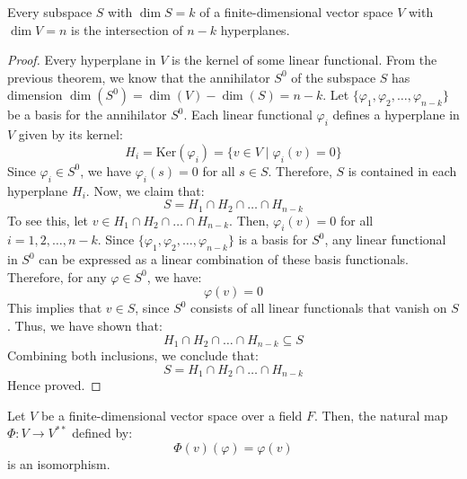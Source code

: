 \documentclass[openany]{book}
\begin{document}
\begin{corollary}
    Every subspace $S$ with $\dim S = k$ of a finite-dimensional vector space $V$ with $\dim V = n$ is the intersection of $n-k$ hyperplanes.
\end{corollary}
\begin{proof}
    Every hyperplane in $V$ is the kernel of some linear functional. From the previous theorem, we know that the annihilator $S^0$ of the subspace $S$ has dimension $\dim(S^0) = \dim(V) - \dim(S) = n - k$. Let $\{\varphi_1, \varphi_2, \ldots, \varphi_{n-k}\}$ be a basis for the annihilator $S^0$. Each linear functional $\varphi_i$ defines a hyperplane in $V$ given by its kernel:
    $$H_i = \text{Ker}(\varphi_i) = \{v \in V \mid \varphi_i(v) = 0\}$$
    Since $\varphi_i \in S^0$, we have $\varphi_i(s) = 0$ for all $s \in S$. Therefore, $S$ is contained in each hyperplane $H_i$. Now, we claim that:
    $$S = H_1 \cap H_2 \cap \ldots \cap H_{n-k}$$
    To see this, let $v \in H_1 \cap H_2 \cap \ldots \cap H_{n-k}$. Then, $\varphi_i(v) = 0$ for all $i = 1, 2, \ldots, n-k$. Since $\{\varphi_1, \varphi_2, \ldots, \varphi_{n-k}\}$ is a basis for $S^0$, any linear functional in $S^0$ can be expressed as a linear combination of these basis functionals. Therefore, for any $\varphi \in S^0$, we have:
    $$\varphi(v) = 0$$
    This implies that $v \in S$, since $S^0$ consists of all linear functionals that vanish on $S$. Thus, we have shown that:
    $$H_1 \cap H_2 \cap \ldots \cap H_{n-k} \subseteq S$$
    Combining both inclusions, we conclude that:
    $$S = H_1 \cap H_2 \cap \ldots \cap H_{n-k}$$
    Hence proved.
\end{proof}
\begin{mytheorem}
Let $V$ be a finite-dimensional vector space over a field $F$. Then, the natural map $\Phi: V \to V^{**}$ defined by:
$$\Phi(v)(\varphi) = \varphi(v)$$
is an isomorphism.
\end{mytheorem}
\end{document}
